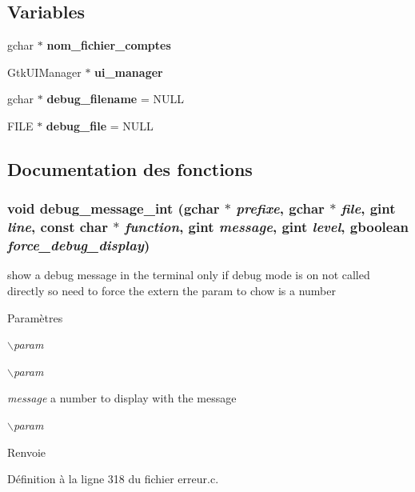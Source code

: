 \subsection*{Variables}
\begin{DoxyCompactItemize}
\item 
gchar $\ast$ {\bf nom\_\-fichier\_\-comptes}
\item 
GtkUIManager $\ast$ {\bf ui\_\-manager}
\item 
gchar $\ast$ {\bf debug\_\-filename} = NULL
\item 
FILE $\ast$ {\bf debug\_\-file} = NULL
\end{DoxyCompactItemize}


\subsection{Documentation des fonctions}
\subsubsection[{debug\_\-message\_\-int}]{\setlength{\rightskip}{0pt plus 5cm}void debug\_\-message\_\-int (gchar $\ast$ {\em prefixe}, \/  gchar $\ast$ {\em file}, \/  gint {\em line}, \/  const char $\ast$ {\em function}, \/  gint {\em message}, \/  gint {\em level}, \/  gboolean {\em force\_\-debug\_\-display})}\label{erreur_8c_ae591dcdff555bc84145ac56dd9a29100}
show a debug message in the terminal only if debug mode is on not called directly so need to force the extern the param to chow is a number


\begin{DoxyParams}{Paramètres}
\item[{\em $\backslash$param}]\item[{\em $\backslash$param}]\item[{\em message}]a number to display with the message \item[{\em $\backslash$param}]\end{DoxyParams}
\begin{DoxyReturn}{Renvoie}

\end{DoxyReturn}


Définition à la ligne 318 du fichier erreur.c.

